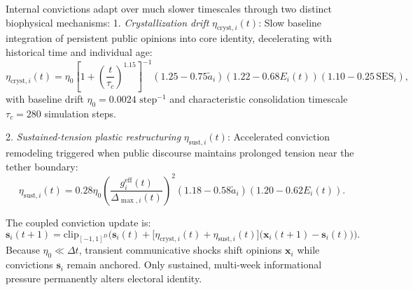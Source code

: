\documentclass[11pt,a4paper]{article}
\begin{document}
Internal convictions adapt over much slower timescales through two distinct biophysical mechanisms:
1. \emph{Crystallization drift} $\eta_{\text{cryst}, i}(t)$: Slow baseline integration of persistent public opinions into core identity, decelerating with historical time and individual age:
\begin{equation}
    \eta_{\text{cryst}, i}(t) = \eta_0 \left[1 + \left(\frac{t}{\tau_c}\right)^{1.15}\right]^{-1} (1.25 - 0.75\tilde{a}_i)(1.22 - 0.68 E_i(t))(1.10 - 0.25\,\mathrm{SES}_i),
    \label{eq:crystallization_rate}
\end{equation}
with baseline drift $\eta_0 = 0.0024 \text{ step}^{-1}$ and characteristic consolidation timescale $\tau_c = 280$ simulation steps.

2. \emph{Sustained-tension plastic restructuring} $\eta_{\mathrm{sust}, i}(t)$: Accelerated conviction remodeling triggered when public discourse maintains prolonged tension near the tether boundary:
\begin{equation}
    \eta_{\mathrm{sust}, i}(t) = 0.28 \eta_0 \left(\frac{g_i^{\mathrm{eff}}(t)}{\Delta_{\max, i}(t)}\right)^2 (1.18 - 0.58\tilde{a}_i)(1.20 - 0.62 E_i(t)).
    \label{eq:sustained_tension_rate}
\end{equation}

The coupled conviction update is:
\begin{equation}
    \mathbf{s}_i(t+1) = \mathrm{clip}_{[-1, 1]^D}\!\Big(\mathbf{s}_i(t) + \big[\eta_{\text{cryst}, i}(t) + \eta_{\mathrm{sust}, i}(t)\big]\big(\mathbf{x}_i(t+1) - \mathbf{s}_i(t)\big)\Big).
    \label{eq:conviction_update_full}
\end{equation}
Because $\eta_0 \ll \Delta t$, transient communicative shocks shift opinions $\mathbf{x}_i$ while convictions $\mathbf{s}_i$ remain anchored. Only sustained, multi-week informational pressure permanently alters electoral identity.
\end{document}
